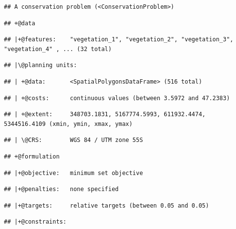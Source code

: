 \documentclass[
  12pt,
]{book}
\begin{document}
\begin{verbatim}
## A conservation problem (<ConservationProblem>)
\end{verbatim}

\begin{verbatim}
## +@data
\end{verbatim}

\begin{verbatim}
## |+@features:    "vegetation_1", "vegetation_2", "vegetation_3", "vegetation_4" , ... (32 total)
\end{verbatim}

\begin{verbatim}
## |\@planning units:
\end{verbatim}

\begin{verbatim}
## | +@data:       <SpatialPolygonsDataFrame> (516 total)
\end{verbatim}

\begin{verbatim}
## | +@costs:      continuous values (between 3.5972 and 47.2383)
\end{verbatim}

\begin{verbatim}
## | +@extent:     348703.1831, 5167774.5993, 611932.4474, 5344516.4109 (xmin, ymin, xmax, ymax)
\end{verbatim}

\begin{verbatim}
## | \@CRS:        WGS 84 / UTM zone 55S
\end{verbatim}

\begin{verbatim}
## +@formulation
\end{verbatim}

\begin{verbatim}
## |+@objective:   minimum set objective
\end{verbatim}

\begin{verbatim}
## |+@penalties:   none specified
\end{verbatim}

\begin{verbatim}
## |+@targets:     relative targets (between 0.05 and 0.05)
\end{verbatim}

\begin{verbatim}
## |+@constraints:
\end{verbatim}
\end{document}
